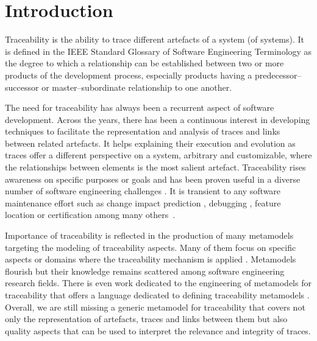 \section{Introduction} \label{sec:intro}

Traceability is the ability to trace different artefacts of a system (of systems). It is defined in the IEEE Standard Glossary of Software Engineering Terminology \cite{ieeeglossary-se} as the degree to which a relationship can be established between two or more products of the development process, especially products having a predecessor–successor or master–subordinate relationship to one another. 

The need for traceability has always been a recurrent aspect of software development. Across the years, there has been a continuous interest in developing techniques to facilitate the representation and analysis of traces and links between related artefacts. It helps explaining their execution and evolution as traces offer a different perspective on a system, arbitrary and customizable, where the relationships between elements is the most salient artefact. Traceability rises awareness on specific purposes or goals \cite{clelandhuang2014-traceability-trends-and-futurte-direction} and has been proven useful in a diverse number of software engineering challenges \cite{guo2017-semantically-enhanced-tracebility-deep-learning}. It is transient to any software maintenance effort such as change impact prediction \cite{helming2009-traceability-change-awareness,goknil2014-change-impact-analysis-for-requirement-metamodel}, debugging \cite{ko2008-whyline-debugging,aboussoror2012-Seeing-errors-trace-visualisation}, feature location \cite{dit2013informationRetrievalTraceabilityForFeatureLocation,meinicke2017-feature-traceability} or certification \cite{moy2013-DO-178C-testing} among many others~\cite{jaber2013-effect-on-maintenance}.

Importance of traceability is reflected in the production of many metamodels targeting the modeling of traceability aspects. Many of them focus on specific aspects or domains where the traceability mechanism is applied \cite{antoniol2017-traceability-grand-challenges,wohlrab2020-traceability-organization-process-culture,winkler2010-survey-traceability-and-MDE}. Metamodels flourish but their knowledge remains scattered among software engineering research fields. There is even work dedicated to the engineering of metamodels for traceability that offers a language dedicated to defining traceability metamodels \cite{drivalos2008-engineering-a-DSL-for-traceability}. Overall, we are still missing a generic metamodel for traceability that covers not only the representation of artefacts, traces and links between them but also quality aspects that can be used to interpret the relevance and integrity of traces. 

